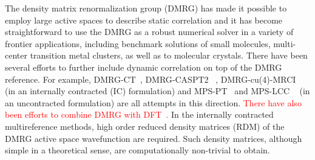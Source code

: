 The density matrix renormalization group (DMRG) \cite{white_density_1992,white_density-matrix_1993, ostlund_thermodynamic_1995, rommer_class_1997, schollwock_density-matrix_2005, schollwock_density-matrix_2011} has made it possible to employ  large active spaces 
to describe static correlation\cite{white_ab_1999, chan_highly_2002, legeza_controlling_2003,moritz_decomposition_2007, verstraete_matrix_2008, marti_density_2008, zgid_spin_2008, marti_density_2010, kurashige_high-performance_2009, luo_optimizing_2010, chan_density_2011, marti_new_2011, sharma_spin-adapted_2012, wouters_longitudinal_2012, wouters_thouless_2013, kurashige_entangled_2013, wouters_communication:_2014} and it has become straightforward to
use the DMRG as a robust numerical solver in a variety of frontier applications, including benchmark solutions of small molecules\cite{chan_highly_2002,legeza_controlling_2003,luo_optimizing_2010, olivares-amaya_ab-initio_2015}, multi-center transition metal clusters\cite{kurashige_high-performance_2009,marti_new_2011, kurashige_entangled_2013, sharma_low-energy_2014}, as well as to molecular crystals\cite{yang_ab_2014}. There have been several
efforts to further include dynamic correlation on top of the DMRG reference.
For example, DMRG-CT~\cite{neuscamman_review_2010}, DMRG-CASPT2 ~\cite{kurashige_second-order_2011}, DMRG-cu(4)-MRCI ~\cite{saitow_fully_2015} (in an internally contracted (IC) formulation) and MPS-PT~\cite{sharma_communication:_2014} and MPS-LCC ~\cite{sharma_multireference_2015} (in an uncontracted
formulation) 
are all attempts in this direction. \textcolor{red}{There have also been efforts to combine DMRG with DFT~\cite{reiher_dmrg}.}
In the internally contracted multireference methods, high order reduced density matrices (RDM) of the DMRG active space wavefunction are required.
Such density matrices, although simple in a theoretical sense, are computationally non-trivial to obtain.

